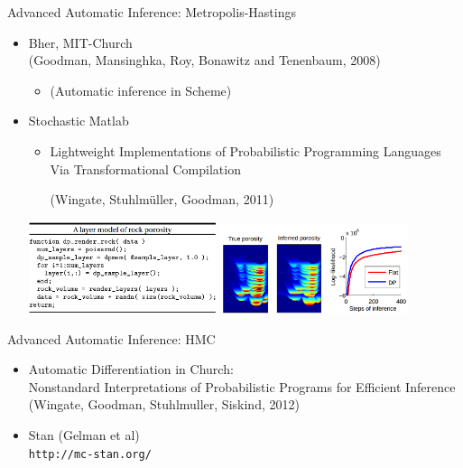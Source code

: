 \begin{frame}{Advanced Automatic Inference: Metropolis-Hastings}
    \begin{itemize}
      \item Bher, MIT-Church
      \\ {\color{DarkBlue}(Goodman, Mansinghka, Roy, Bonawitz and Tenenbaum, 2008)}
      \begin{itemize}
         \item (Automatic inference in Scheme)
      \end{itemize}      
      \item Stochastic Matlab
    \begin{itemize}
      \item Lightweight Implementations of Probabilistic Programming Languages Via Transformational Compilation {\color{DarkBlue} 
      
      (Wingate, Stuhlm\"{u}ller, Goodman, 2011)}
    \end{itemize}      
            \includegraphics[width=5.5cm]{figures/probmatlab.png}
            \includegraphics[width=5.5cm]{figures/probmatlab2.png}
    \end{itemize}
\end{frame}

\begin{frame}{Advanced Automatic Inference: HMC}

    \begin{itemize}
      \item Automatic Differentiation in Church:
      \\ Nonstandard Interpretations of Probabilistic Programs for Efficient Inference
{\color{DarkBlue} (Wingate, Goodman, Stuhlmuller, Siskind, 2012)}
      \item Stan (Gelman et al)
      \\
      \texttt{http://mc-stan.org/}
      \begin{alltt}
{\tiny
}
\end{alltt}  
      
    \end{itemize}

\end{frame}

